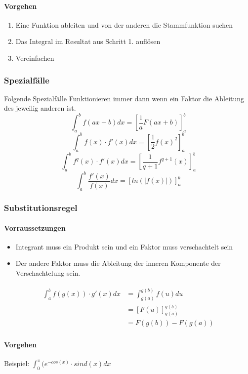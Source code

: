 \paragraph{Vorgehen}
\begin{enumerate}
	\item Eine Funktion ableiten und von der anderen die Stammfunktion suchen
	\item Das Integral im Resultat aus Schritt 1. auflösen
	\item Vereinfachen
\end{enumerate}

\subsubsection{Spezialfälle}
Folgende Spezialfälle Funktionieren immer dann wenn ein Faktor die Ableitung des jeweilig anderen ist.
\[
	\int_{a}^{b} f(ax + b) dx = \left[ \frac{1}{a} F(ax + b) \right]_{a}^{b}
\]
\[
\int_{a}^{b} f(x) \cdot f'(x) dx = \left[\frac{1}{2} f(x)^2 \right]_{a}^{b}
\]
\[
\int_{a}^{b} f^q(x) \cdot f'(x) dx = \left[\frac{1}{q+1} f^{q+1} (x) \right]_{a}^{b} 
\]
\[
\int_{a}^{b} \frac{f'(x)}{f(x)} dx = \left[ln(|f(x)|) \right]_{a}^{b}
\]

\subsubsection{Substitutionsregel}
\paragraph{Vorraussetzungen}
\begin{itemize}
	\item Integrant muss ein Produkt sein und ein Faktor muss verschachtelt sein
	\item Der andere Faktor muss die Ableitung der inneren Komponente der Verschachtelung sein.
\end{itemize}
\begin{align}
\begin{split}
	 \int_a^b f(g(x)) \cdot g'(x) dx &= \int_{g(a)}^{g(b)} f(u) du \\
	 &= \left[ F(u) \right]_{g(a)}^{g(b)} \\
	 &= F(g(b)) - F(g(a))
\end{split}
\end{align}

\paragraph{Vorgehen}
Beispiel: $\int_{0}^{\pi} (e^{-cos(x)} \cdot sind(x ) dx$

